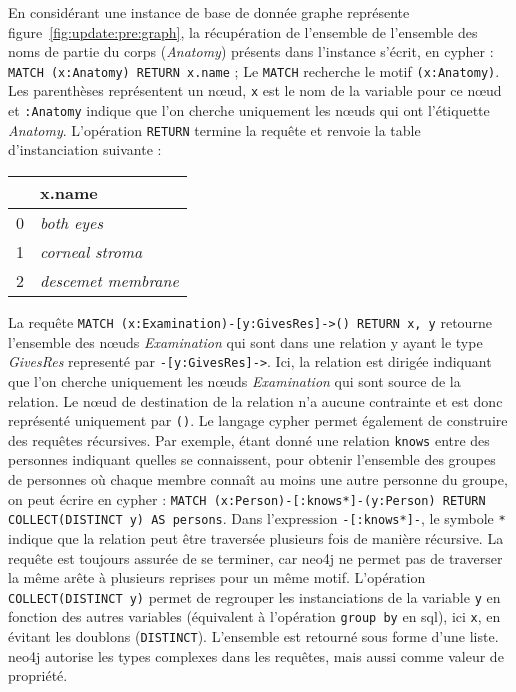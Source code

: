 \begin{example}
    En considérant une instance de base de donnée graphe représente figure~\ref{fig:update:pre:graph}, la récupération de l'ensemble de l'ensemble des noms de partie du corps (\emph{Anatomy}) présents dans l'instance s'écrit, en \gls{cypher} : \verb|MATCH (x:Anatomy) RETURN x.name| ;
    Le \verb|MATCH| recherche le motif \verb|(x:Anatomy)|.
    Les parenthèses représentent un nœud, \verb|x| est le nom de la variable pour ce nœud et \verb|:Anatomy| indique que l'on cherche uniquement les nœuds qui ont l'étiquette \emph{Anatomy}.
    L'opération \verb|RETURN| termine la requête et renvoie la table d'instanciation suivante :

    \begin{center}
        \begin{tabular}{c|l}
              & x.name                   \\
            \hline
            0 & \emph{both eyes}         \\
            1 & \emph{corneal stroma}    \\
            2 & \emph{descemet membrane}
        \end{tabular}
    \end{center}

    La requête \verb|MATCH (x:Examination)-[y:GivesRes]->() RETURN x, y| retourne l'ensemble des nœuds \emph{Examination} qui sont dans une relation y ayant le type \emph{GivesRes} representé par \verb|-[y:GivesRes]->|.
    Ici, la relation est dirigée indiquant que l'on cherche uniquement les nœuds \emph{Examination} qui sont source de la relation.
    Le nœud de destination de la relation n'a aucune contrainte et est donc représenté uniquement par \verb|()|.
    Le langage \gls{cypher} permet également de construire des requêtes récursives.
    Par exemple, étant donné une relation \verb|knows| entre des personnes indiquant quelles se connaissent, pour obtenir l'ensemble des groupes de personnes où chaque membre connaît au moins une autre personne du groupe, on peut écrire en \gls{cypher} : \verb|MATCH (x:Person)-[:knows*]-(y:Person) RETURN COLLECT(DISTINCT y) AS persons|.
    Dans l'expression \verb|-[:knows*]-|, le symbole \verb|*| indique que la relation peut être traversée plusieurs fois de manière récursive.
    La requête est toujours assurée de se terminer, car \gls{neo4j} ne permet pas de traverser la même arête à plusieurs reprises pour un même motif.
    L'opération \verb|COLLECT(DISTINCT y)| permet de regrouper les instanciations de la variable \verb|y| en fonction des autres variables (équivalent à l'opération \verb|group by| en \gls{sql}), ici \verb|x|, en évitant les doublons (\verb|DISTINCT|).
    L'ensemble est retourné sous forme d'une liste.
    \gls{neo4j} autorise les types complexes dans les requêtes, mais aussi comme valeur de propriété.
\end{example}
